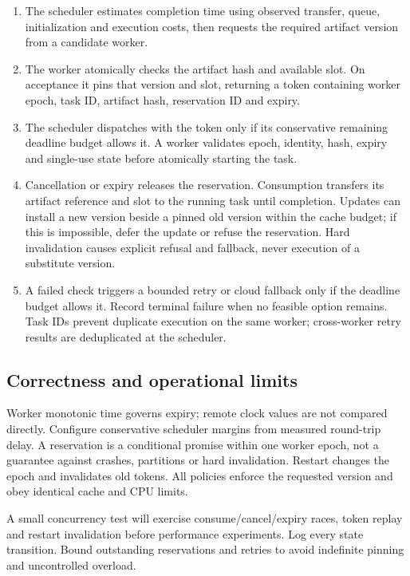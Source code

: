 \documentclass[11pt,a4paper]{article}
\begin{document}
\begin{enumerate}
\item The scheduler estimates completion time using observed transfer, queue, initialization and execution costs, then requests the required artifact version from a candidate worker.
\item The worker atomically checks the artifact hash and available slot. On acceptance it pins that version and slot, returning a token containing worker epoch, task ID, artifact hash, reservation ID and expiry.
\item The scheduler dispatches with the token only if its conservative remaining deadline budget allows it. A worker validates epoch, identity, hash, expiry and single-use state before atomically starting the task.
\item Cancellation or expiry releases the reservation. Consumption transfers its artifact reference and slot to the running task until completion. Updates can install a new version beside a pinned old version within the cache budget; if this is impossible, defer the update or refuse the reservation. Hard invalidation causes explicit refusal and fallback, never execution of a substitute version.
\item A failed check triggers a bounded retry or cloud fallback only if the deadline budget allows it. Record terminal failure when no feasible option remains. Task IDs prevent duplicate execution on the same worker; cross-worker retry results are deduplicated at the scheduler.
\end{enumerate}

\subsection{Correctness and operational limits}

Worker monotonic time governs expiry; remote clock values are not compared directly. Configure conservative scheduler margins from measured round-trip delay. A reservation is a conditional promise within one worker epoch, not a guarantee against crashes, partitions or hard invalidation. Restart changes the epoch and invalidates old tokens. All policies enforce the requested version and obey identical cache and CPU limits.

A small concurrency test will exercise consume/cancel/expiry races, token replay and restart invalidation before performance experiments. Log every state transition. Bound outstanding reservations and retries to avoid indefinite pinning and uncontrolled overload.
\end{document}
